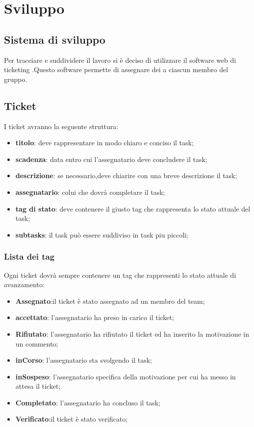 \section{Sviluppo}
	\subsection{Sistema di sviluppo}
	Per tracciare e suddividere il lavoro si è deciso di utilizzare il software web di ticketing .Questo software permette di assegnare dei  a ciascun membro del gruppo.
	\subsection{Ticket}
	I ticket avranno la seguente struttura:
	\begin{itemize}
		\item \textbf{titolo}: deve rappresentare in modo chiaro e conciso il task;
		\item \textbf{scadenza}: data entro cui l'assegnatario deve concludere il task;
		\item \textbf{descrizione}: se necessario,deve chiarire con una breve descrizione il task;
		\item \textbf{assegnatario}: colui che dovrà completare il task;
		\item \textbf{tag di stato}: deve contenere il giusto tag che rappresenta lo stato attuale del task; 
		\item \textbf{subtasks}: il task può essere suddiviso in task piu piccoli;
	\end{itemize}
		\subsubsection{Lista dei tag}
		Ogni ticket dovrà sempre contenere un tag che rappresenti lo stato attuale di avanzamento:
		\begin{itemize}
			\item \textbf{Assegnato}:il ticket è stato assegnato ad un membro del team;
			\item \textbf{accettato}: l'assegnatario ha preso in carico il ticket;
			\item \textbf{Rifiutato}: l'assegnatario ha rifiutato il ticket ed ha inserito la motivazione in un commento;
			\item \textbf{inCorso}: l'assegnatario sta svolgendo il task;
			\item \textbf{inSospeso}: l'assegnatario specifica della motivazione per cui ha messo in attesa il ticket;
			\item \textbf{Completato}: l'assegnatario ha concluso il task;
			\item \textbf{Verificato}:il ticket è stato verificato;
		\end{itemize}
